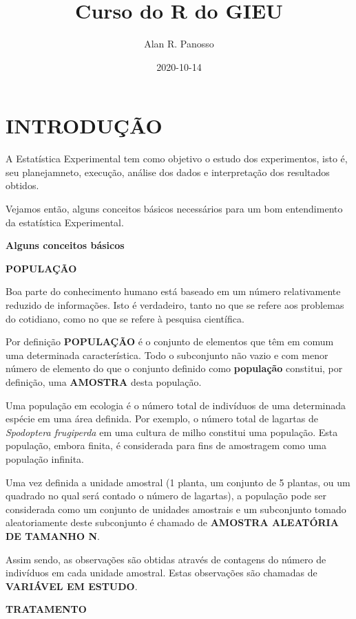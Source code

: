 \documentclass[
]{book}
\title{Curso do R do GIEU}
\author{Alan R. Panosso}
\date{2020-10-14}
\begin{document}
\maketitle

{
\setcounter{tocdepth}{1}
\tableofcontents
}
\hypertarget{introduuxe7uxe3o}{%
\chapter{INTRODUÇÃO}\label{introduuxe7uxe3o}}

A Estatística Experimental tem como objetivo o estudo dos experimentos, isto é, seu planejamneto, execução, análise dos dados e interpretação dos resultados obtidos.

Vejamos então, alguns conceitos básicos necessários para um bom entendimento da estatística Experimental.

\textbf{Alguns conceitos básicos}

\textbf{POPULAÇÃO}

Boa parte do conhecimento humano está baseado em um número relativamente reduzido de informações. Isto é verdadeiro, tanto no que se refere aos problemas do cotidiano, como no que se refere à pesquisa científica.

Por definição \textbf{POPULAÇÃO} é o conjunto de elementos que têm em comum uma determinada característica. Todo o subconjunto não vazio e com menor número de elemento do que o conjunto definido como \textbf{população} constitui, por definição, uma \textbf{AMOSTRA} desta população.

Uma população em ecologia é o número total de indivíduos de uma determinada espécie em uma área definida. Por exemplo, o número total de lagartas de \emph{Spodoptera frugiperda} em uma cultura de milho constitui uma população. Esta população, embora finita, é considerada para fins de amostragem como uma população infinita.

Uma vez definida a unidade amostral (1 planta, um conjunto de 5 plantas, ou um quadrado no qual será contado o número de lagartas), a população pode ser considerada como um conjunto de unidades amostrais e um subconjunto tomado aleatoriamente deste subconjunto é chamado de \textbf{AMOSTRA ALEATÓRIA DE TAMANHO N}.

Assim sendo, as observações são obtidas através de contagens do número de indivíduos em cada unidade amostral. Estas observações são chamadas de \textbf{VARIÁVEL EM ESTUDO}.

\textbf{TRATAMENTO}
\end{document}
